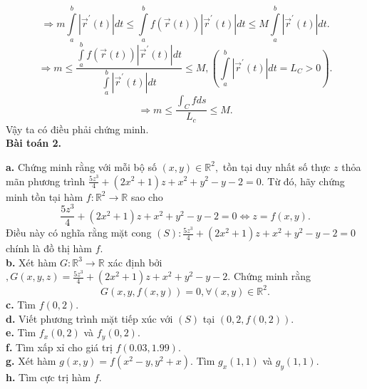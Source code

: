 \documentclass[12pt,a4paper]{article}
\begin{document}
\[ \Rightarrow m\int\limits_a^b {\left| {{{\overrightarrow r }^\prime }\left( t \right)} \right|dt}  \leqslant \int\limits_a^b {f\left( {\overrightarrow r \left( t \right)} \right)\left| {{{\overrightarrow r }^\prime }\left( t \right)} \right|} dt \leqslant M\int\limits_a^b {\left| {{{\overrightarrow r }^\prime }\left( t \right)} \right|dt} .\]
\[ \Rightarrow m \leqslant \frac{{\int\limits_a^b {f\left( {\overrightarrow r \left( t \right)} \right)\left| {{{\overrightarrow r }^\prime }\left( t \right)} \right|} dt}}{{\int\limits_a^b {\left| {{{\overrightarrow r }^\prime }\left( t \right)} \right|dt} }} \leqslant M,\left( {\int\limits_a^b {\left| {{{\overrightarrow r }^\prime }\left( t \right)} \right|dt} = L_C  > 0} \right).\]
\[ \Rightarrow m \leqslant \frac{{\int_C {fds} }}{{{L_c}}} \leqslant M.\]
Vậy ta có điều phải chứng minh.\\
\textbf{Bài toán 2.}
\begin{mybox}
\textbf{a.} Chứng minh rằng với mỗi bộ số \(\left( {x,y} \right) \in {\mathbb{R}^2},\) tồn tại duy nhất số thực \(z\) thỏa mãn phương trình \(\frac{{5{z^3}}}{4} + \left( {2{x^2} + 1} \right)z + {x^2} + {y^2} - y - 2 = 0.\) Từ đó, hãy chứng minh tồn tại hàm \(f:{\mathbb{R}^2} \to \mathbb{R}\) sao cho
\[\frac{{5{z^3}}}{4} + \left( {2{x^2} + 1} \right)z + {x^2} + {y^2} - y - 2 = 0 \Leftrightarrow z = f\left( {x,y} \right).\]
Điều này có nghĩa rằng mặt cong \(\left( S \right):\frac{{5{z^3}}}{4} + \left( {2{x^2} + 1} \right)z + {x^2} + {y^2} - y - 2 = 0\) chính là đồ thị hàm \(f.\)\\
\textbf{b.} Xét hàm \(G:{\mathbb{R}^3} \to \mathbb{R}\) xác định bởi \(,G\left( {x,y,z} \right) = \frac{{5{z^3}}}{4} + \left( {2{x^2} + 1} \right)z + {x^2} + {y^2} - y - 2.\) Chứng minh rằng
\[G\left( {x,y,f\left( {x,y} \right)} \right) = 0,\forall \left( {x,y} \right) \in {\mathbb{R}^2}.\]
\textbf{c.} Tìm \(f\left( {0,2} \right).\)\\
\textbf{d.} Viết phương trình mặt tiếp xúc với \(\left( S \right)\) tại \(\left( {0,2,f\left( {0,2} \right)} \right).\)\\
\textbf{e.} Tìm \({f_x}\left( {0,2} \right)\) và \({f_y}\left( {0,2} \right).\)\\
\textbf{f.} Tìm xấp xỉ cho giá trị \(f\left( {0.03,1.99} \right).\)\\
\textbf{g.} Xét hàm \(g\left( {x,y} \right) = f\left( {{x^2} - y,{y^2} + x} \right).\) Tìm \({g_x}\left( {1,1} \right)\) và \({g_y}\left( {1,1} \right).\)\\
\textbf{h.} Tìm cực trị hàm \(f.\) 
\end{mybox}
\end{document}
